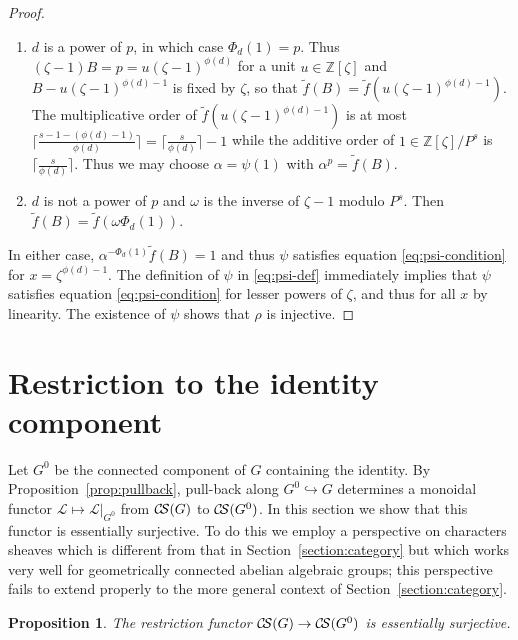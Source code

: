 \documentclass[11pt]{amsart}
\theoremstyle{plain}
\newtheorem{proposition}[theorem]{Proposition}
\theoremstyle{definition}
\theoremstyle{remark}
\newcommand{\ZZ}{{\mathbb{Z}}}
\newcommand{\cs}[1]{{\mathcal{#1}}}
\newcommand{\CS}{{\mathcal{C\hskip-1.8pt S}}}
\begin{document}
\begin{proof}
\begin{enumerate}
\item $d$ is a power of $p$, in which case $\Phi_d(1) = p$.  Thus $(\zeta-1)B = p = u(\zeta-1)^{\phi(d)}$ for a unit $u \in \ZZ[\zeta]$ and $B - u(\zeta-1)^{\phi(d)-1}$ is fixed by $\zeta$, so that $\tilde{f}(B) = \tilde{f}(u(\zeta - 1)^{\phi(d)-1})$.  The multiplicative order of $\tilde{f}(u(\zeta-1)^{\phi(d)-1})$ is at most $\lceil \frac{s - 1 - (\phi(d)-1)}{\phi(d)}\rceil = \lceil \frac{s}{\phi(d)} \rceil - 1$ while the additive order of $1 \in \ZZ[\zeta]/P^s$ is $\lceil \frac{s}{\phi(d)} \rceil$.  Thus we may choose $\alpha = \psi(1)$ with $\alpha^p = \tilde{f}(B)$.
\item $d$ is not a power of $p$ and $\omega$ is the inverse of $\zeta-1$ modulo $P^s$.  Then $\tilde{f}(B) = \tilde{f}(\omega\Phi_d(1))$.
\end{enumerate}
In either case, $\alpha^{-\Phi_d(1)}\tilde{f}(B) = 1$ and thus $\psi$ satisfies equation \ref{eq:psi-condition} for $x = \zeta^{\phi(d)-1}$.  The definition of $\psi$ in \ref{eq:psi-def} immediately implies that $\psi$ satisfies equation \ref{eq:psi-condition} for lesser powers of $\zeta$, and thus for all $x$ by linearity.  The existence of $\psi$ shows that $\rho$ is injective.
\end{proof}

\section{Restriction to the identity component}

%
Let $G^0$ be the connected component of $G$ containing the identity. 
By Proposition~\ref{prop:pullback}, pull-back along $G^0\hookrightarrow G$ determines a monoidal functor $\cs{L}\mapsto \cs{L}\vert_{G^0}$ from $\CS(G)$ to $\CS(G^0)$.  In this section we show that this functor is essentially surjective. To do this we employ a perspective on characters sheaves which is different from that in Section~\ref{section:category} but which works very well for geometrically connected abelian algebraic groups; this perspective fails to extend properly to the more general context of Section~\ref{section:category}.

\begin{proposition}\label{prop:restriction}
The restriction functor $\CS(G)\to \CS(G^0)$ is essentially surjective.
\end{proposition}
\end{document}
